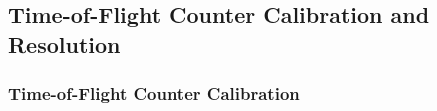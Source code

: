 \subsection{\label{sec:calib.tof}Time-of-Flight Counter Calibration and Resolution}

\subsubsection{\label{sec:calib.tof.calib}Time-of-Flight Counter Calibration}


